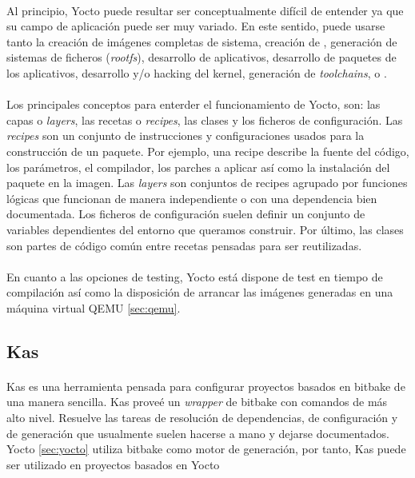 \paragraph{}Al principio, Yocto puede resultar ser conceptualmente difícil de entender
ya que su campo de aplicación puede ser muy variado. En este sentido, puede usarse tanto
la creación de imágenes completas de sistema, creación de \emph{}, generación
de sistemas de ficheros (\emph{rootfs}), desarrollo de aplicativos, desarrollo de paquetes
de los aplicativos, desarrollo y/o hacking del kernel, generación de  \emph{toolchains},
 o .

\paragraph{\label{layers} \label{recipes}}Los principales conceptos para enterder el
funcionamiento de Yocto, son:
las capas o \emph{layers}, las recetas o \emph{recipes}, las clases y los ficheros de
configuración. Las \emph{recipes} son un conjunto de instrucciones y configuraciones
usados para la construcción de un paquete. Por ejemplo, una recipe describe la fuente
del código, los parámetros, el compilador, los parches a aplicar así como la instalación
del paquete en la imagen. Las \emph{layers} son conjuntos de recipes agrupado por
funciones lógicas que funcionan de manera independiente o con una dependencia bien
documentada. Los ficheros de configuración suelen definir un conjunto de variables
dependientes del entorno que queramos construir. Por último, las clases son partes de
código común entre recetas pensadas para ser reutilizadas.

\paragraph{}En cuanto a las opciones de testing, Yocto está dispone de test en tiempo
de compilación así como la disposición de arrancar las imágenes generadas en una máquina
virtual QEMU \ref{sec:qemu}.

\subsection{Kas}\label{sec:kas}

\paragraph{}Kas es una herramienta pensada para configurar proyectos basados en bitbake
de una manera sencilla. Kas proveé un \emph{wrapper} de bitbake con comandos de más alto
nivel. Resuelve las tareas de resolución de dependencias, de configuración y de
generación que usualmente suelen hacerse a mano y dejarse documentados. Yocto
\ref{sec:yocto} utiliza bitbake como motor de generación, por tanto, Kas puede ser
utilizado en proyectos basados en Yocto
\cite{kas}

